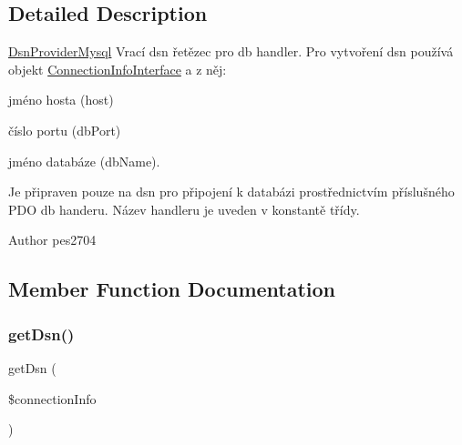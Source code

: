 \subsection{Detailed Description}
\mbox{\hyperlink{class_pes_1_1_database_1_1_handler_1_1_dsn_provider_1_1_dsn_provider_mysql}{Dsn\+Provider\+Mysql}} Vrací dsn řetězec pro db handler. Pro vytvoření dsn používá objekt \mbox{\hyperlink{interface_pes_1_1_database_1_1_handler_1_1_connection_info_interface}{Connection\+Info\+Interface}} a z něj\+: 
\begin{DoxyItemize}
\item jméno hosta (host) 
\item číslo portu (db\+Port) 
\item jméno databáze (db\+Name).
\end{DoxyItemize}

Je připraven pouze na dsn pro připojení k databázi prostřednictvím příslušného P\+DO db handeru. Název handleru je uveden v konstantě třídy.

\begin{DoxyAuthor}{Author}
pes2704 
\end{DoxyAuthor}


\subsection{Member Function Documentation}
\mbox{\label{class_pes_1_1_database_1_1_handler_1_1_dsn_provider_1_1_dsn_provider_mysql_a7252e2f23ea50a5061fef81d06d6765a}} 
\subsubsection{\texorpdfstring{get\+Dsn()}{getDsn()}}
{\footnotesize\ttfamily get\+Dsn (\begin{DoxyParamCaption}\item[{\mbox{\hyperlink{interface_pes_1_1_database_1_1_handler_1_1_connection_info_interface}{Connection\+Info\+Interface}}}]{\$connection\+Info }\end{DoxyParamCaption})}

